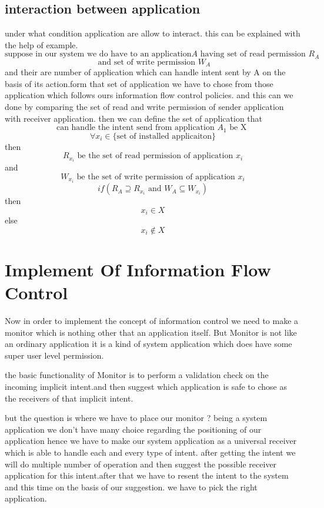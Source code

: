 \documentclass[11pt]{report}
\begin{document}
\subsection{interaction between application}
under what condition application are allow to interact.
this can be explained with the help of example.
\[\textrm{suppose in our system we do have to an application} A\textrm{ having set of read permission }R_A \]
\[\textrm{ and set of write permission }W_A  \]
and their are number of application which can handle intent sent by A on the basis of its action.form that set of application we have to chose 
from those application which follows ours information flow control policies.
and this can we done by comparing the set of read and write permission of sender application with receiver application.
then we can define the set of application that \[\textrm{can handle the intent send from application } A_1 \textrm{ be X } \]
\[\forall x_i \in \textrm{\{set of installed applicaiton\}} \]
then\[ R_{x_i}\textrm{ be the set of read permission of application }x_i\]
and\[ W_{x_i}\textrm{ be the set of write permission of application }x_i\]
\[ if( R_A \supseteq R_{x_i} \textrm{ and } W_A \subseteq W_{x_i})\]
then \[x_i \in X\]
else \[x_i \notin X\]

\section{Implement Of Information Flow Control}
Now in order to implement the concept of information control we need to make a monitor which is nothing other that an application itself.
But Monitor is not like an ordinary application it is a kind of system application which does have some super user level permission.
\par 
the basic functionality of Monitor is to perform a validation check  on the incoming implicit intent.and then suggest which application is 
safe to chose as the receivers of that implicit intent.
\par
but the question is where we have to place our monitor ? being a system application we don't have many choice regarding the positioning of 
our application hence we have to make our system application as a universal receiver which is able to handle each and every type of intent.
after getting the intent we will do multiple number of operation  and then suggest the possible receiver application for this intent.after that 
we have to resent the intent to the system and this time on the basis of our suggestion. we have to pick the right application.
\end{document}
